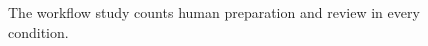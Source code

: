 \begin{figure}[H]
\centering
{}
\caption{The workflow study counts human preparation and review in every condition.}\label{fig:teach-P-04-prototype-04}
\end{figure}

